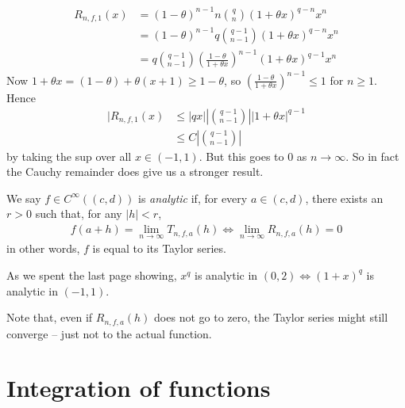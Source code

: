 \documentclass{../template/note}
\begin{document}
\begin{example*}
\begin{itemize}
\begin{align*}
                R_{n,f,1}(x) &= (1-\theta)^{n-1}n\binom q n (1+\theta x)^{q-n}x^n \\
                &= (1-\theta)^{n-1}q\binom {q-1}{n-1} (1+\theta x)^{q-n}x^n \\
                &= q \binom{q-1}{n-1} \left(\frac{1-\theta}{1+\theta x}\right)^{n-1} (1+\theta x)^{q-1}x^n
            \end{align*}
            Now \(1+\theta x = (1-\theta) + \theta(x+1) \geq 1-\theta\), so \(\left(\frac{1-\theta}{1+\theta x}\right)^{n-1} \leq 1\) for \(n \geq 1\). Hence
            \begin{align*}
                |R_{n,f,1}(x) &\leq |qx|\left|\binom{q-1}{n-1}\right||1+\theta x|^{q-1} \\
                &\leq C\left|\binom{q-1}{n-1}\right|
            \end{align*}
            by taking the sup over all \(x \in (-1, 1)\). But this goes to 0 as \(n \to \infty\). So in fact the Cauchy remainder does give us a stronger result.    
        \end{itemize}
    \end{example*}
    
    \begin{definition}
        We say \(f \in C^\infty((c, d))\) is \emph{analytic} if, for every \(a \in (c, d)\), there exists an \(r > 0\) such that, for any \(|h| < r\), 
        \begin{align*}
            f(a+h) = \lim_{n \to \infty} T_{n, f, a}(h) \iff \lim_{n \to \infty} R_{n,f,a}(h) = 0
        \end{align*}
        in other words, \(f\) is equal to its Taylor series.
    \end{definition}
    
    \begin{example*}
        As we spent the last page showing, \(x^q\) is analytic in \((0, 2) \iff (1+x)^q\) is analytic in \((-1, 1)\).
    \end{example*}
    
    \begin{remark*}
        Note that, even if \(R_{n,f,a}(h)\) does not go to zero, the Taylor series might still converge -- just not to the actual function.
    \end{remark*}
    
    \section{Integration of functions}
\end{document}
